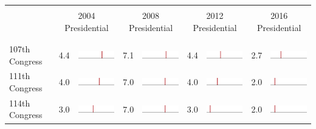 
\begin{table}
\renewcommand{\arraystretch}{0.7}
 \begin{tabular}{l rm{7em} rm{7em} rm{7em} rm{7em}}
\hline \hline \\

{} & \multicolumn{2}{c}{2004 Presidential} & \multicolumn{2}{c}{2008 Presidential} & \multicolumn{2}{c}{2012 Presidential} & \multicolumn{2}{c}{2016 Presidential} \\

\\ \hline \\
107th Congress         &   4.4 &          \includegraphics[width=7em]{mini_hist/WI_2004_107} &   7.1 &          \includegraphics[width=7em]{mini_hist/WI_2008_107} &   4.4 &          \includegraphics[width=7em]{mini_hist/WI_2012_107} &   2.7 &          \includegraphics[width=7em]{mini_hist/WI_2016_107} \\
111th Congress         &   4.0 &          \includegraphics[width=7em]{mini_hist/WI_2004_111} &   7.0 &          \includegraphics[width=7em]{mini_hist/WI_2008_111} &   4.0 &          \includegraphics[width=7em]{mini_hist/WI_2012_111} &   2.0 &          \includegraphics[width=7em]{mini_hist/WI_2016_111} \\
114th Congress         &   3.0 &          \includegraphics[width=7em]{mini_hist/WI_2004_114} &   7.0 &          \includegraphics[width=7em]{mini_hist/WI_2008_114} &   3.0 &          \includegraphics[width=7em]{mini_hist/WI_2012_114} &   2.0 &          \includegraphics[width=7em]{mini_hist/WI_2016_114} \\

\end{tabular}
\end{table}
